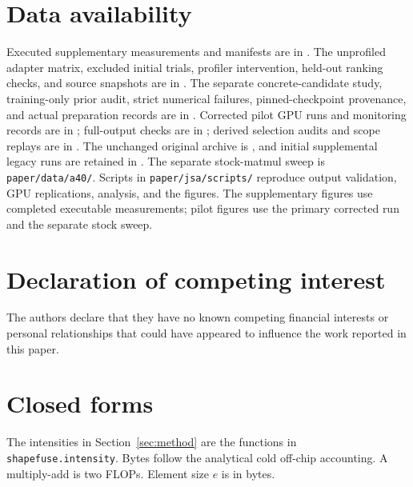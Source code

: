 \documentclass[a4paper,fleqn]{cas-dc}
\begin{document}
\section*{Data availability}
Executed supplementary measurements and manifests are in .
The unprofiled adapter matrix, excluded initial trials, profiler intervention, held-out ranking checks, and source snapshots are in .
The separate concrete-candidate study, training-only prior audit, strict numerical failures, pinned-checkpoint provenance, and actual preparation records are in .
Corrected pilot GPU runs and monitoring records are in ; full-output checks are in ; derived selection audits and scope replays are in .
The unchanged original archive is , and initial supplemental legacy runs are retained in .
The separate stock-matmul sweep is \texttt{paper/data/a40/}.
Scripts in \texttt{paper/jsa/scripts/} reproduce output validation, GPU replications, analysis, and the figures.
The supplementary figures use completed executable measurements; pilot figures use the primary corrected run and the separate stock sweep.

\section*{Declaration of competing interest}
The authors declare that they have no known competing financial interests or personal relationships that could have appeared to influence the work reported in this paper.

\appendix
\section{Closed forms}
\label{app:formulas}

The intensities in Section~\ref{sec:method} are the functions in \texttt{shapefuse.\allowbreak intensity}.
Bytes follow the analytical cold off-chip accounting.
A multiply-add is two FLOPs.
Element size $e$ is in bytes.
\end{document}
